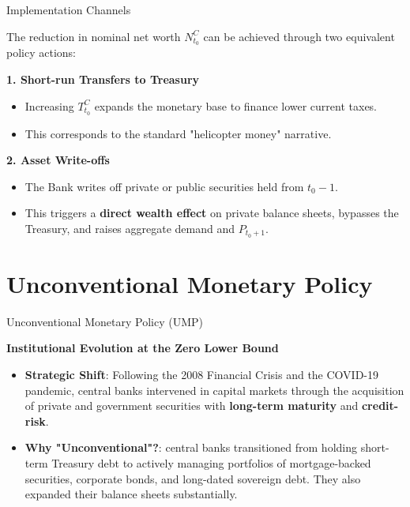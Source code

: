 \documentclass[11pt,aspectratio=169]{beamer}
\begin{document}
\begin{frame}{Implementation Channels}
\small

The reduction in nominal net worth $N_{t_0}^C$ can be achieved through two equivalent policy actions:

\vspace{0.4cm}

\textbf{1. Short-run Transfers to Treasury}
\vspace{0.1cm}
\begin{itemize}
    \item Increasing $T_{t_0}^C$ expands the monetary base to finance lower current taxes.
    \item This corresponds to the standard "helicopter money" narrative.
\end{itemize}

\vspace{0.4cm}

\textbf{2. Asset Write-offs}
\vspace{0.1cm}
\begin{itemize}
    \item The Bank writes off private or public securities held from $t_0-1$.
    \item This triggers a \textbf{direct wealth effect} on private balance sheets, bypasses the Treasury, and raises aggregate demand and $P_{t_0+1}$.
\end{itemize}
\end{frame}


\section{Unconventional Monetary Policy}

\begin{frame}{Unconventional Monetary Policy (UMP)}
\small

\textbf{Institutional Evolution at the Zero Lower Bound}
\vspace{0.2cm}
\begin{itemize}
    \item \textbf{Strategic Shift}: Following the 2008 Financial Crisis and the COVID-19 pandemic, central banks intervened in capital markets through the acquisition of private and government securities with \textbf{long-term maturity} and \textbf{credit-risk}.
    \vspace{0.2cm}
    \item \textbf{Why "Unconventional"?}: central banks transitioned from holding short-term Treasury debt to actively managing portfolios of mortgage-backed securities, corporate bonds, and long-dated sovereign debt. They also expanded their balance sheets substantially.
\end{itemize}

\end{frame}
\end{document}
